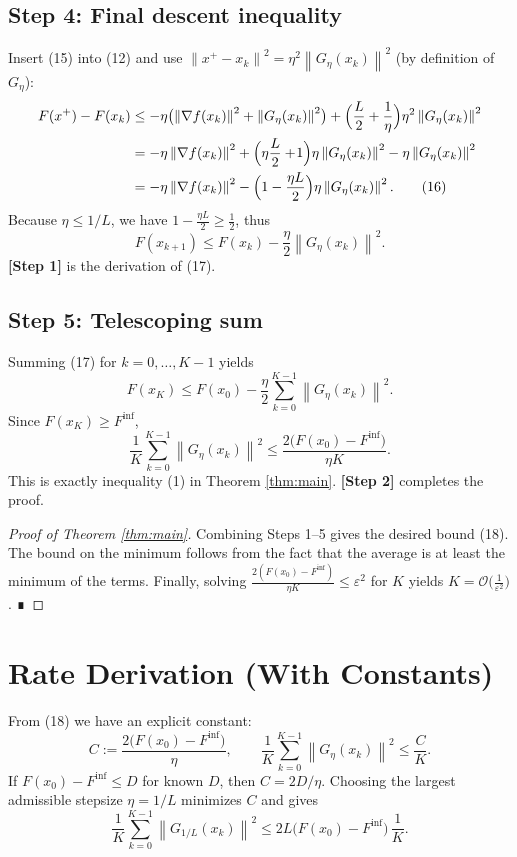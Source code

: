 \documentclass{article}
\newcommand{\grad}{\nabla}
\newcommand{\norm}[1]{\left\lVert #1\right\rVert}
\begin{document}
\subsection*{Step 4: Final descent inequality}
Insert (15) into (12) and use $\norm{x^{+}-x_{k}}^{2}= \eta^{2}\norm{G_{\eta}(x_{k})}^{2}$ (by definition of $G_{\eta}$):
\begin{align}
F(x^{+})-F(x_{k})
&\le -\eta\bigl(\norm{\grad f(x_{k})}^{2}+\norm{G_{\eta}(x_{k})}^{2}\bigr)
   +\Bigl(\frac{L}{2}+\frac{1}{\eta}\Bigr)\eta^{2}\norm{G_{\eta}(x_{k})}^{2} \nonumber\\
&= -\eta\norm{\grad f(x_{k})}^{2}
   +\Bigl(\eta\frac{L}{2}+\!1\Bigr)\eta\norm{G_{\eta}(x_{k})}^{2} -\eta\norm{G_{\eta}(x_{k})}^{2} \nonumber\\
&= -\eta\norm{\grad f(x_{k})}^{2}
   -\Bigl(1-\frac{\eta L}{2}\Bigr)\eta\norm{G_{\eta}(x_{k})}^{2}.
\tag{16}
\end{align}
Because $\eta\le 1/L$, we have $1-\frac{\eta L}{2}\ge \frac12$, thus
\begin{equation}
F(x_{k+1})\le F(x_{k})-\frac{\eta}{2}\norm{G_{\eta}(x_{k})}^{2}.
\tag{17}
\end{equation}
\textbf{[Step 1]} is the derivation of (17).  

\subsection*{Step 5: Telescoping sum}
Summing (17) for $k=0,\dots,K-1$ yields
\[
F(x_{K})\le F(x_{0})-\frac{\eta}{2}\sum_{k=0}^{K-1}\norm{G_{\eta}(x_{k})}^{2}.
\]
Since $F(x_{K})\ge F^{\inf}$,
\[
\frac{1}{K}\sum_{k=0}^{K-1}\norm{G_{\eta}(x_{k})}^{2}
\le \frac{2\bigl(F(x_{0})-F^{\inf}\bigr)}{\eta K}.
\tag{18}
\]
This is exactly inequality (1) in Theorem \ref{thm:main}.  \textbf{[Step 2]} completes the proof.

\begin{proof}[Proof of Theorem \ref{thm:main}]
Combining Steps 1–5 gives the desired bound (18).  The bound on the minimum follows from the fact that the average is at least the minimum of the terms.  Finally, solving $ \frac{2(F(x_{0})-F^{\inf})}{\eta K}\le\varepsilon^{2}$ for $K$ yields $K = \mathcal{O}\bigl(\frac{1}{\varepsilon^{2}}\bigr)$.  ∎
\end{proof}

\section*{Rate Derivation (With Constants)}
From (18) we have an explicit constant:
\[
C:=\frac{2\bigl(F(x_{0})-F^{\inf}\bigr)}{\eta},
\qquad
\frac{1}{K}\sum_{k=0}^{K-1}\norm{G_{\eta}(x_{k})}^{2}\le\frac{C}{K}.
\]
If $F(x_{0})-F^{\inf}\le D$ for known $D$, then $C=2D/\eta$.  Choosing the largest admissible stepsize $\eta=1/L$ minimizes $C$ and gives
\[
\frac{1}{K}\sum_{k=0}^{K-1}\norm{G_{1/L}(x_{k})}^{2}
\le 2L\bigl(F(x_{0})-F^{\inf}\bigr)\,\frac{1}{K}.
\]
\end{document}
